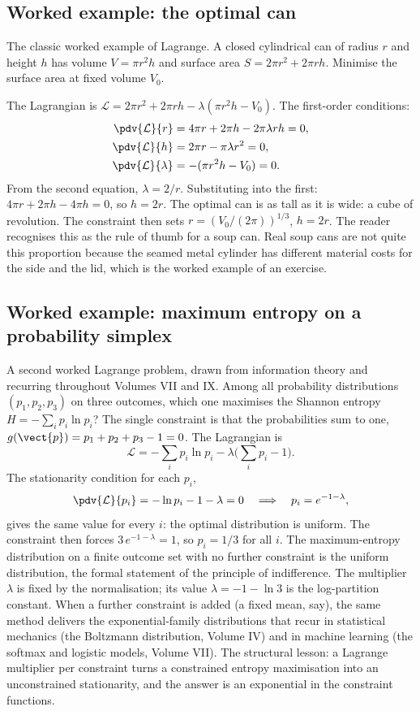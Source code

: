 \subsection{Worked example: the optimal can}

The classic worked example of Lagrange. A closed cylindrical can of
radius $r$ and height $h$ has volume $V = \pi r^{2} h$ and surface
area $S = 2\pi r^{2} + 2\pi r h$. Minimise the surface area at fixed
volume $V_{0}$.

The Lagrangian is $\mathcal{L} = 2\pi r^{2} + 2\pi r h -
\lambda(\pi r^{2} h - V_{0})$. The first-order conditions:
\begin{align*}
\pdv{\mathcal{L}}{r} &= 4\pi r + 2\pi h - 2\pi\lambda r h = 0, \\
\pdv{\mathcal{L}}{h} &= 2\pi r - \pi\lambda r^{2} = 0, \\
\pdv{\mathcal{L}}{\lambda} &= -(\pi r^{2} h - V_{0}) = 0.
\end{align*}
From the second equation, $\lambda = 2/r$. Substituting into the
first: $4\pi r + 2\pi h - 4\pi h = 0$, so $h = 2 r$. The optimal
can is as tall as it is wide: a cube of revolution. The constraint
then sets $r = (V_{0}/(2\pi))^{1/3}$, $h = 2 r$. The reader recognises
this as the rule of thumb for a soup can. Real soup cans are not
quite this proportion because the seamed metal cylinder has different
material costs for the side and the lid, which is the worked example
of an exercise.

\subsection{Worked example: maximum entropy on a probability
simplex}

A second worked Lagrange problem, drawn from information theory and
recurring throughout Volumes VII and IX. Among all probability
distributions $(p_{1}, p_{2}, p_{3})$ on three outcomes, which one
maximises the Shannon entropy $H = -\sum_{i} p_{i}\ln p_{i}$? The
single constraint is that the probabilities sum to one,
$g(\vect{p}) = p_{1} + p_{2} + p_{3} - 1 = 0$. The Lagrangian is
\[
\mathcal{L} = -\sum_{i} p_{i}\ln p_{i} - \lambda\Big(\sum_{i} p_{i}
- 1\Big).
\]
The stationarity condition for each $p_{i}$,
\[
\pdv{\mathcal{L}}{p_{i}} = -\ln p_{i} - 1 - \lambda = 0
\quad\Longrightarrow\quad p_{i} = e^{-1 - \lambda},
\]
gives the same value for every $i$: the optimal distribution is
uniform. The constraint then forces $3\,e^{-1 - \lambda} = 1$, so
$p_{i} = 1/3$ for all $i$. The maximum-entropy distribution on a
finite outcome set with no further constraint is the uniform
distribution, the formal statement of the principle of indifference.
The multiplier $\lambda$ is fixed by the normalisation; its value
$\lambda = -1 - \ln 3$ is the log-partition constant. When a further
constraint is added (a fixed mean, say), the same method delivers
the exponential-family distributions that recur in statistical
mechanics (the Boltzmann distribution, Volume IV) and in machine
learning (the softmax and logistic models, Volume VII). The
structural lesson: a Lagrange multiplier per constraint turns a
constrained entropy maximisation into an unconstrained
stationarity, and the answer is an exponential in the constraint
functions.


